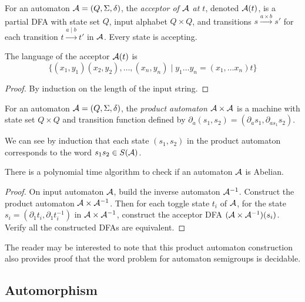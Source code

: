 \documentclass[11pt, titlepage]{article}
\begin{document}
\begin{definition}
  For an automaton $\mathcal{A} = (Q,\Sigma, \delta)$, the \emph{acceptor of
    $\mathcal{A}$ at $t$}, denoted $\mathcal{A}(t)$, is a partial DFA with state set
  $Q$, input alphabet $Q \times Q$, and transitions
  $s \stackrel{a \times b}{\longrightarrow} s'$ for each transition
  $t \stackrel{a \mid b}{\longrightarrow} t'$ in $\mathcal{A}$. Every state is
  accepting.
\end{definition}

\begin{lemma}
  The language of the acceptor $\mathcal{A}(t)$ is
  \[
    \{(x_1, y_1)(x_2, y_2),\ldots,(x_n, y_n) \mid y_1\ldots y_n =
    (x_1,\ldots x_n)t \}
  \]
\end{lemma}
\begin{proof}
  By induction on the length of the input string.
\end{proof}

\begin{definition}
  For an automaton $\mathcal{A} = (Q, \Sigma, \delta)$, the \emph{product
    automaton} $\mathcal{A} \times \mathcal{A}$ is a machine with state set $Q\times Q$
  and transition function defined by
  $\partial_a (s_1, s_2) = (\partial_a s_1, \partial_{a s_1} s_2)$.
\end{definition}

We can see by induction that each state $(s_1, s_2)$ in the product
automaton corresponds to the word $s_1 s_2 \in S(\mathcal{A})$.

\begin{theorem}
  There is a polynomial time algorithm to check if an automaton $\mathcal{A}$
  is Abelian.
\end{theorem}

\begin{proof}
  On input automaton $\mathcal{A}$, build the inverse automaton
  $\mathcal{A}^{-1}$. Construct the product automaton $\mathcal{A}\times \mathcal{A}^{-1}$. Then
  for each toggle state $t_i$ of $\mathcal{A}$, for the state
  $s_i = (\partial_1 t_i, \partial_1 t_i^{-1})$ in $\mathcal{A}\times \mathcal{A}^{-1}$,
  construct the acceptor DFA $(\mathcal{A}\times \mathcal{A}^{-1})(s_i)$. Verify all the
  constructed DFAs are equivalent.
\end{proof}

The reader may be interested to note that this product automaton
construction also provides proof that the word problem for automaton
semigroups is decidable.

\subsection{Automorphism }
\end{document}
